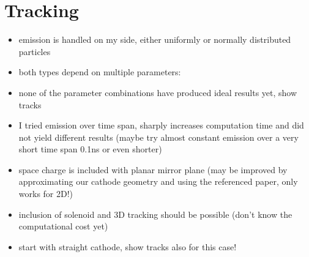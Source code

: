 \section{Tracking}
\begin{itemize}
  \item emission is handled on my side, either uniformly or normally distributed particles
  \item both types depend on multiple parameters:
  \item none of the parameter combinations have produced ideal results yet, show tracks
  \item I tried emission over time span, sharply increases computation time and did not yield different results (maybe try almost constant emission over a very short time span 0.1ns or even shorter)
  \item space charge is included with planar mirror plane (may be improved by approximating our cathode geometry and using the referenced paper, only works for 2D!)
  \item inclusion of solenoid and 3D tracking should be possible (don't know the computational cost yet)
  \item start with straight cathode, show tracks also for this case!
\end{itemize}

%   
